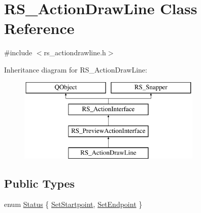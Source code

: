 \hypertarget{classRS__ActionDrawLine}{\section{R\-S\-\_\-\-Action\-Draw\-Line Class Reference}
\label{classRS__ActionDrawLine}
}


{\ttfamily \#include $<$rs\-\_\-actiondrawline.\-h$>$}

Inheritance diagram for R\-S\-\_\-\-Action\-Draw\-Line\-:\begin{figure}[H]
\begin{center}
\leavevmode
\includegraphics[height=4.000000cm]{classRS__ActionDrawLine}
\end{center}
\end{figure}
\subsection*{Public Types}
\begin{DoxyCompactItemize}
\item 
enum \hyperlink{classRS__ActionDrawLine_a885462502f6f10b5d4f03bdc4e9b322b}{Status} \{ \hyperlink{classRS__ActionDrawLine_a885462502f6f10b5d4f03bdc4e9b322ba70f12197494457eada2be713d7ec4280}{Set\-Startpoint}, 
\hyperlink{classRS__ActionDrawLine_a885462502f6f10b5d4f03bdc4e9b322baee97132168da5a379101a036748065da}{Set\-Endpoint}
 \}
\end{DoxyCompactItemize}
